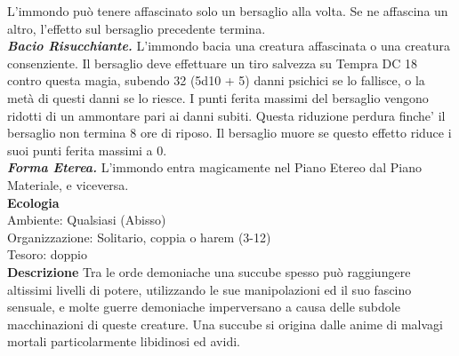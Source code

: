 \begin{multicols}{2}
L'immondo può tenere affascinato solo un bersaglio alla volta. Se ne affascina un altro, l'effetto sul bersaglio precedente termina.\\
\emph{\textbf{Bacio Risucchiante.}} L'immondo bacia una creatura affascinata o una creatura consenziente. Il bersaglio deve effettuare un tiro salvezza su Tempra DC  18 contro questa magia, subendo 32 (5d10 + 5) danni psichici se lo fallisce, o la metà di questi danni se lo riesce. I punti ferita massimi del bersaglio vengono ridotti di un ammontare pari ai danni subiti. Questa riduzione perdura finche' il bersaglio non termina 8 ore di riposo. Il bersaglio muore se questo effetto riduce i suoi punti ferita massimi a 0.\\
\emph{\textbf{Forma Eterea.}} L'immondo entra magicamente nel Piano Etereo dal Piano Materiale, e viceversa.\\
\textbf{Ecologia}\\
Ambiente: Qualsiasi (Abisso)\\
Organizzazione: Solitario, coppia o harem (3-12)\\
Tesoro: doppio\\
\textbf{Descrizione}
Tra le orde demoniache una succube spesso può raggiungere altissimi livelli di potere, utilizzando le sue manipolazioni ed il suo fascino sensuale, e molte guerre demoniache imperversano a causa delle subdole macchinazioni di queste creature. Una succube si origina dalle anime di malvagi mortali particolarmente libidinosi ed avidi.\\



\end{multicols}
